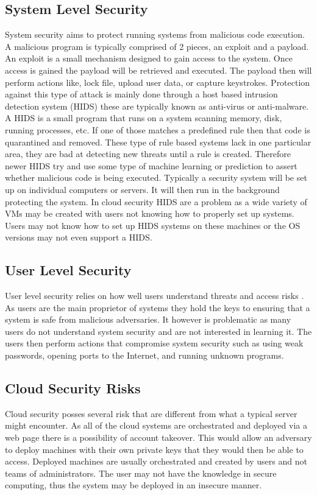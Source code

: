 \documentclass[12pt]{article}
\begin{document}
\subsection{System Level Security}
System security aims to protect running systems from malicious code execution. A malicious program is typically comprised of 2 pieces, an exploit and a payload. An exploit is a small mechanism designed to gain access to the system. Once access is gained the payload will be retrieved and executed. The payload then will perform actions like, lock file, upload user data, or capture keystrokes. Protection against this type of attack is mainly done through a host based intrusion detection system (HIDS) these are typically known as anti-virus or anti-malware. A HIDS is a small program that runs on a system scanning memory, disk, running processes, etc. If one of those matches a predefined rule then that code is quarantined and removed. These type of rule based systems lack in one particular area, they are bad at detecting new threats until a rule is created. Therefore newer HIDS try and use some type of machine learning or prediction to assert whether malicious code is being executed. Typically a security system will be set up on individual computers or servers. It will then run in the background protecting the system. In cloud security HIDS are a problem \cite{modi2013survey} as a wide variety of VMs may be created with users not knowing how to properly set up systems. Users may not know how to set up HIDS systems on these machines or the OS versions may not even support a HIDS.

\subsection{User Level Security}
User level security relies on how well users understand threats and access risks \cite{stanton2005analysis}. As users are the main proprietor of systems they hold the keys to ensuring that a system is safe from malicious adversaries. It however is problematic as many users do not understand system security and are not interested in learning it. The users then perform actions that compromise system security such as using weak passwords, opening ports to the Internet, and running unknown programs.

\subsection{Cloud Security Risks}
Cloud security posses several risk that are different from what a typical server might encounter. As all of the cloud systems are orchestrated and deployed via a web page there is a possibility of account takeover. This would allow an adversary to deploy machines with their own private keys that they would then be able to access. Deployed machines are usually orchestrated and created by users and not teams of administrators. The user may not have the knowledge in secure computing, thus the system may be deployed in an insecure manner.
\end{document}
